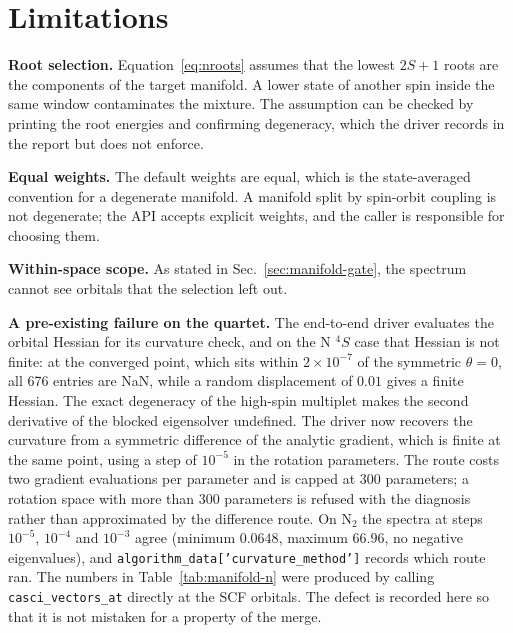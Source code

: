 \section{Limitations}
\label{sec:manifold-limits}

\textbf{Root selection.}  Equation~\eqref{eq:nroots} assumes that the
lowest $2S+1$ roots are the components of the target manifold.  A
lower state of another spin inside the same window contaminates the
mixture.  The assumption can be checked by printing the root energies
and confirming degeneracy, which the driver records in the report but
does not enforce.

\textbf{Equal weights.}  The default weights are equal, which is the
state-averaged convention for a degenerate manifold.  A manifold split
by spin-orbit coupling is not degenerate; the API accepts explicit
weights, and the caller is responsible for choosing them.

\textbf{Within-space scope.}  As stated in
Sec.~\ref{sec:manifold-gate}, the spectrum cannot see orbitals that
the selection left out.

\textbf{A pre-existing failure on the quartet.}  The end-to-end
driver evaluates the orbital Hessian for its curvature check, and on
the N $^{4}S$ case that Hessian is not finite: at the converged point,
which sits within $2\times10^{-7}$ of the symmetric $\theta=0$, all
676 entries are NaN, while a random displacement of $0.01$ gives a
finite Hessian.  The exact degeneracy of the high-spin multiplet makes
the second derivative of the blocked eigensolver undefined.  The
driver now recovers the curvature from a symmetric difference of the
analytic gradient, which is finite at the same point, using a step of
$10^{-5}$ in the rotation parameters.  The route costs two gradient
evaluations per parameter and is capped at 300 parameters; a rotation
space with more than 300 parameters is refused with the diagnosis
rather than approximated by the difference route.  On N$_2$ the
spectra at steps $10^{-5}$, $10^{-4}$ and $10^{-3}$ agree (minimum
$0.0648$, maximum $66.96$, no negative eigenvalues), and
\texttt{algorithm\_data['curvature\_method']} records which route ran.
The numbers in Table~\ref{tab:manifold-n} were produced by calling
\texttt{casci\_vectors\_at} directly at the SCF orbitals.  The defect
is recorded here so that it is not mistaken for a property of the
merge.
